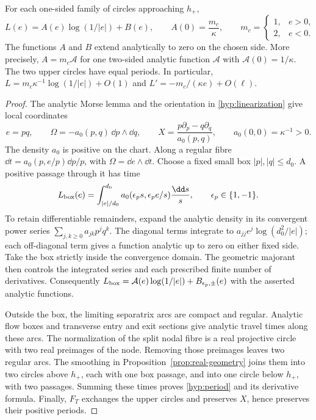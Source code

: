 \begin{lemma}\label{lem:hyperbolic-period}
For each one-sided family of circles approaching $h_+$,
\begin{equation}\label{hyp:period}
 L(e)=A(e)\log(1/|e|)+B(e),\qquad
 A(0)=\frac{m_c}{\kappa},\qquad
 m_c=\begin{cases}1,&e>0,\\2,&e<0.\end{cases}
\end{equation}
The functions $A$ and $B$ extend analytically to zero on the chosen
side.  More precisely, $A=m_c\mathcal A$ for one two-sided analytic
function $\mathcal A$ with $\mathcal A(0)=1/\kappa$.
The two upper circles have equal periods.  In particular,
$L=m_c\kappa^{-1}\log(1/|e|)+O(1)$ and
$L'=-m_c/(\kappa e)+O(\ell)$.
\end{lemma}

\begin{proof}
The analytic Morse lemma and the orientation in
\eqref{hyp:linearization} give local coordinates
\begin{equation}\label{hyp:morse}
 e=pq,\qquad \Omega=-a_0(p,q)\,\dd p\wedge\dd q,\qquad
 X=\frac{p\partial_p-q\partial_q}{a_0(p,q)},\qquad
 a_0(0,0)=\kappa^{-1}>0.
\end{equation}
The density $a_0$ is positive on the chart.
Along a regular fibre $\dd t=a_0(p,e/p)\dd p/p$, with
$\Omega=\dd e\wedge\dd t$.  Choose a fixed small box
$|p|,|q|\le d_0$.  A positive passage through it has time
\[
 L_{\rm box}(e)=\int_{|e|/d_0}^{d_0}
     a_0(\epsilon_p s,\epsilon_p e/s)\frac{\dd s}{s},
 \qquad \epsilon_p\in\{1,-1\}.
\]
To retain differentiable remainders, expand the analytic density in its
convergent power series $\sum_{j,k\ge0}a_{jk}p^jq^k$.
The diagonal terms integrate to
$a_{jj}e^j\log(d_0^2/|e|)$; each off-diagonal term gives a function
analytic up to zero on either fixed side.  Take the box strictly inside
the convergence domain.  The geometric majorant then controls the
integrated series and each prescribed finite number of derivatives.
Consequently
$L_{\rm box}=\mathcal A(e)\log(1/|e|)+B_{\epsilon_p,\pm}(e)$
with the asserted analytic functions.

Outside the box, the limiting separatrix arcs are compact and regular.
Analytic flow boxes and transverse entry and exit sections give analytic
travel times along these arcs.  The normalization of the split nodal
fibre is a real projective circle with two real preimages of the node.
Removing those preimages leaves two regular arcs.  The smoothing in
Proposition~\ref{prop:real-geometry} joins them into two circles above
$h_+$, each with one box passage, and into one circle below $h_+$, with
two passages.  Summing these times proves \eqref{hyp:period} and its
derivative formula.  Finally, $F_T$ exchanges the upper circles and
preserves $X$, hence preserves their positive periods.
\end{proof}

